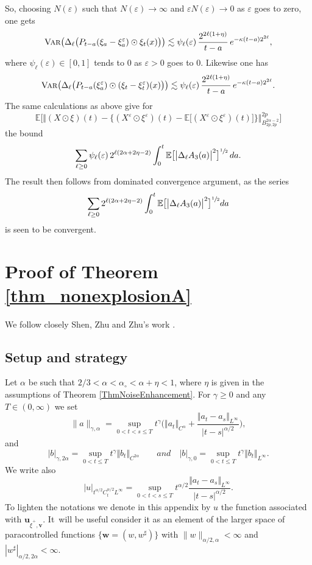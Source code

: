 \documentclass[JEP,XML,SOM,Unicode,published]{cedram}
\theoremstyle{definition}
\let\epsilon\varepsilon
\let\eps\epsilon
\newcommand\bbE{\mathbb{E}}
\newcommand{\bsu}{\boldsymbol{u}}
\newcommand{\bsv}{\boldsymbol{v}}
\newcommand{\bsw}{\boldsymbol{w}}
\newcommand{\norme}[1]{\Vert #1 \Vert}
\begin{document}
\par\smallskip\noindent
So, choosing $N(\eps)$ such that $N(\eps)\to \infty$ and $\eps N(\eps)\to 0$ as $\eps$ goes to zero, one gets
\[
\textsc{{Var}}\bigl( \Delta_\ell\bigl( P_{t-a}(\xi_a-\xi_a^{\eps})\odot \xi_t (x) \bigr) \bigr) \lesssim \psi_\ell(\eps) \, \frac{2^{2\ell(1+\eta)}}{t-a} \, e^{-\kappa(t-a)2^{2\ell}},
\]
where $\psi_\ell(\eps)\in[0,1]$ tends to $0$ as $\epsilon>0$ goes to $0$. Likewise one has
\[
\textsc{{Var}}\bigl( \Delta_\ell\bigl( P_{t-a}(\xi_a^\eps)\odot (\xi_t-\xi_t^\eps) (x) \bigr) \bigr) \lesssim \psi_\ell(\eps) \, \frac{2^{2\ell(1+\eta)}}{t-a} \, e^{-\kappa(t-a)2^{2\ell}}.
\]
The same calculations as above give for
\[
\bbE\bigl[\big\Vert (X\odot\xi)(t) - \bigl\{ (X^\eps\odot\xi^\eps)(t)-\bbE\bigl[(X^\eps\odot\xi^\eps)(t) \bigr]\bigr\}\big\Vert_{B^{2\alpha-2}_{2p,2p}}^{2p}\bigr]
\]
the bound
\[
\sum_{\ell\geq 0} \psi_\ell(\eps) \, 2^{\ell(2\alpha+2\eta-2)} \int_0^t \bbE\bigl[\big| \Delta_\ell A_3(a)\big|^2 \bigr]^{\sfrac{1}{2}} \, da.
\]
The result then follows from dominated convergence argument, as the series
\[
\sum_{\ell\geq 0} 2^{\ell(2\alpha+2\eta-2)} \int_0^t \bbE\bigl[\big| \Delta_\ell A_3(a)\big|^2 \bigr]^{\sfrac{1}{2}} da
\]
is seen to be convergent.

\section{Proof of Theorem \ref{thm_nonexplosionA}}
\label{section_appendix_nonexplosion}

We follow closely Shen, Zhu and Zhu's work \cite{ShenZhuZhu}.

\subsection{Setup and strategy}

Let $\alpha$ be such that $2 / 3 <
\alpha < \alpha_{\circ} <\alpha+\eta< 1$, where $\eta$ is given in the assumptions of Theorem \ref{ThmNoiseEnhancement}. For $\gamma \geq 0$ and any $T\in(0,\infty)$ we
set
\[
\| a \|_{\gamma, \alpha} = \sup_{0 < t < s \leq T} t^{\gamma} \bigl( \norme{ a_t
}_{C^\alpha} + \frac{\norme{ a_t - a_s }_{L^{\infty}}}{| t - s |^{\alpha / 2}}
\bigr),
\]
and
\[
| b |_{\gamma, 2 \alpha} = \sup_{0 < t \leq T} t^{\gamma} \norme{ b_t }_{C^{2
\alpha}}
\qquad \textit{and} \quad
|b|_{\gamma, 0} = \sup_{0 < t \leq T} t^{\gamma} \norme{ b_t }_{L^{\infty}}.
\]
We write also
\[
| u |_{t^{\alpha / 2} C^{\alpha / 2}_t L^{\infty}} = \sup_{0 < t < s \leq T} t^{\alpha/2} \frac{\norme{ a_t - a_s }_{L^{\infty}}}{| t - s |^{\alpha / 2}}.
\]
To lighten the notations we denote in this appendix by $u$ the function associated with $\bsu_{\widehat\xi^+,\bsv}$. It~will be useful consider it as an element of the larger space of paracontrolled functions $\{\bsw = (w, w^{\sharp}) \}$ with $\| w \|_{\alpha / 2, \alpha} < \infty$ and $| w^{\sharp} |_{\alpha / 2, 2 \alpha} <
\infty$.
\end{document}
